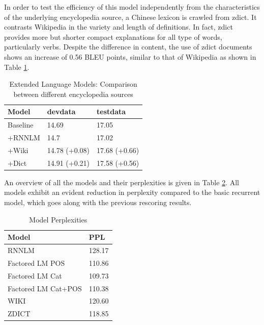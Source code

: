 \documentclass[a4paper]{article}
\begin{document}
In order to test the efficiency of this model independently from the characteristics of the  underlying encyclopedia  source, a Chinese lexicon is crawled from zdict. It contrasts Wikipedia in the variety and length of definitions. In fact, zdict provides more but shorter compact explanations for all type of words, particularly verbs. Despite the difference in content, the use of zdict documents shows an increase of 0.56 BLEU points, similar to that of Wikipedia as shown in Table \ref{tb:zh-extended-diff-sources}.

\begin{table}
\caption{Extended Language Models: Comparison between different encyclopedia sources}
\centering
  \begin{tabular}{lll}
  	\hline
  	Model    & devdata       & testdata      \\ \hline\hline
  	Baseline & 14.69         & 17.05         \\
  	+RNNLM   & 14.7          & 17.02         \\ \hline
  	+Wiki    & 14.78 (+0.08) & 17.68 (+0.66) \\
  	+Dict    & 14.91 (+0.21) & 17.58 (+0.56) \\ \hline
  \end{tabular}
  \label{tb:zh-extended-diff-sources}
\end{table}

An overview of all the models and their perplexities is given in Table \ref{tb:PPL}. All models exhibit an evident reduction in perplexity compared to the basic recurrent model, which goes along with the previous rescoring results.

\begin{table} 
  \caption{Model Perplexities}
  \centering
  \begin{tabular}{ ll}
  	\hline
  	Model               & PPL    \\ \hline\hline
  	RNNLM               & 128.17 \\ \hline
  	Factored LM POS     & 110.86 \\
  	Factored LM Cat     & 109.73 \\
  	Factored LM Cat+POS & 110.38 \\ \hline
  	WIKI                & 120.60 \\
  	ZDICT               & 118.85 \\ \hline
  \end{tabular}
  \label{tb:PPL}
\end{table}
\end{document}

